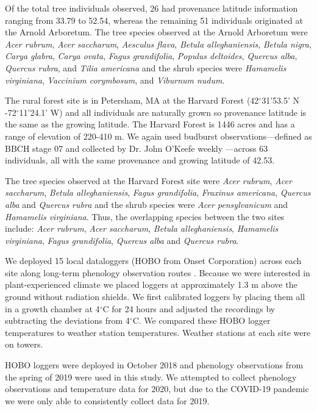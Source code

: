 \documentclass{article}\usepackage[]{graphicx}\usepackage[]{color}
\begin{document}
Of the total tree individuals observed, 26 had provenance latitude information ranging from 33.79 to 52.54, whereas the remaining 51 individuals originated at the Arnold Arboretum. The tree species observed at the Arnold Arboretum were \textit{Acer rubrum}, \textit{Acer saccharum}, \textit{Aesculus flava}, \textit{Betula alleghaniensis}, \textit{Betula nigra}, \textit{Carya glabra}, \textit{Carya ovata}, \textit{Fagus grandifolia}, \textit{Populus deltoides}, \textit{Quercus alba}, \textit{Quercus rubra}, and \textit{Tilia americana} and the shrub species were \textit{Hamamelis virginiana}, \textit{Vaccinium corymbosum}, and \textit{Viburnum nudum}. 

The rural forest site is in Petersham, MA at the Harvard Forest (42$^{\circ}$31'53.5' N -72$^{\circ}$11'24.1' W) and all individuals are naturally grown so provenance latitude is the same as the growing latitude. The Harvard Forest is 1446 acres and has a range of elevation of 220-410 m. We again used budburst observations---defined as BBCH stage 07 and collected by Dr. John O'Keefe weekly \citep{OKeefe2014}---across 63 individuals, all with the same provenance and growing latitude of 42.53. 

The tree species observed at the Harvard Forest site were \textit{Acer rubrum}, \textit{Acer saccharum}, \textit{Betula alleghaniensis},  \textit{Fagus grandifolia}, \textit{Fraxinus americana}, \textit{Quercus alba} and \textit{Quercus rubra} and the shrub species were \textit{Acer pensylvanicum} and \textit{Hamamelis virginiana}. Thus, the overlapping species between the two sites include: \textit{Acer rubrum}, \textit{Acer saccharum}, \textit{Betula alleghaniensis}, \textit{Hamamelis virginiana}, \textit{Fagus grandifolia}, \textit{Quercus alba} and \textit{Quercus rubra}.

We deployed 15 local dataloggers (HOBO from Onset Corporation) across each site along long-term phenology observation routes \citep{OKeefe2014}. Because we were interested in plant-experienced climate we placed loggers at approximately 1.3 m above the ground without radiation shields. We first calibrated loggers by placing them all in a growth chamber at 4$^{\circ}$C for 24 hours and adjusted the recordings by subtracting the deviations from 4$^{\circ}$C. We compared these HOBO logger temperatures to weather station temperatures. Weather stations at each site were on towers.

HOBO loggers were deployed in October 2018 and phenology observations from the spring of 2019 were used in this study. We attempted to collect phenology observations and temperature data for 2020, but due to the COVID-19 pandemic we were only able to consistently collect data for 2019. 
\end{document}
